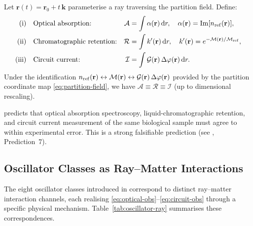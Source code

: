 \begin{theorem}
\label{thm:triple-observation}
Let $\mathbf{r}(t) = \mathbf{r}_0 + t\,\hat{\mathbf{k}}$ parameterise a ray
traversing the partition field.  Define:
\begin{align}
  \text{(i)}&\quad\text{Optical absorption:}&
    \mathcal{A} &= \int \alpha(\mathbf{r})\,\mathrm{d}r,
      \quad \alpha(\mathbf{r}) = \operatorname{Im}[n_{\mathrm{ref}}(\mathbf{r})],
      \label{eq:optical-obs}\\
  \text{(ii)}&\quad\text{Chromatographic retention:}&
    \mathcal{R} &= \int k'(\mathbf{r})\,\mathrm{d}r,
      \quad k'(\mathbf{r}) = e^{-\mathcal{M}(\mathbf{r})/\mathcal{M}_{\mathrm{ref}}},
      \label{eq:chrom-obs}\\
  \text{(iii)}&\quad\text{Circuit current:}&
    \mathcal{I} &= \int \mathcal{G}(\mathbf{r})\,\Delta\varphi(\mathbf{r})\,\mathrm{d}r.
      \label{eq:circuit-obs}
\end{align}
Under the identification $n_{\mathrm{ref}}(\mathbf{r}) \leftrightarrow
\mathcal{M}(\mathbf{r}) \leftrightarrow \mathcal{G}(\mathbf{r})\,\Delta\varphi(\mathbf{r})$
provided by the partition coordinate map \eqref{eq:partition-field}, we have
$\mathcal{A} \equiv \mathcal{R} \equiv \mathcal{I}$ (up to dimensional
rescaling).
\end{theorem}

\begin{remark}
 predicts that optical absorption spectroscopy,
liquid-chromatographic retention, and circuit current measurement of the same
biological sample must agree to within experimental error.  This is a strong
falsifiable prediction (see , Prediction~7).
\end{remark}

\subsection{Oscillator Classes as Ray--Matter Interactions}

The eight oscillator classes introduced in 
correspond to distinct ray--matter interaction channels, each realising
\eqref{eq:optical-obs}--\eqref{eq:circuit-obs} through a specific physical
mechanism.  Table~\ref{tab:oscillator-ray} summarises these correspondences.

